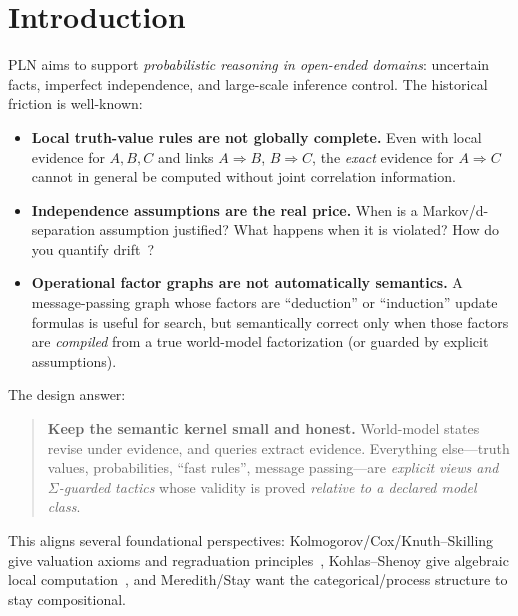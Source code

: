 \documentclass[]{article}
\begin{document}
\section{Introduction}
\label{sec:intro}

PLN aims to support \emph{probabilistic reasoning in open-ended domains}:
uncertain facts, imperfect independence, and large-scale inference control.
The historical friction is well-known:

\begin{itemize}[leftmargin=2em]
\item \textbf{Local truth-value rules are not globally complete.}
Even with local evidence for $A,B,C$ and links $A\Rightarrow B$,
$B\Rightarrow C$, the \emph{exact} evidence for $A\Rightarrow C$ cannot in
general be computed without joint correlation information.
\item \textbf{Independence assumptions are the real price.}
When is a Markov/d-separation assumption justified? What happens when it is
violated? How do you quantify drift~\cite{Pearl1988}?
\item \textbf{Operational factor graphs are not automatically semantics.}
A message-passing graph whose factors are ``deduction'' or ``induction''
update formulas is useful for search, but semantically correct only when
those factors are \emph{compiled} from a true world-model factorization (or
guarded by explicit assumptions).
\end{itemize}

The design answer:

\begin{quote}
\textbf{Keep the semantic kernel small and honest.}
World-model states revise under evidence, and queries extract evidence.
Everything else---truth values, probabilities, ``fast rules'', message
passing---are \emph{explicit views and $\Sigma$-guarded tactics} whose
validity is proved \emph{relative to a declared model class}.
\end{quote}

This aligns several foundational perspectives:
Kolmogorov/Cox/Knuth--Skilling give valuation axioms and regraduation
principles~\cite{KnuthSkilling2012},
Kohlas--Shenoy give algebraic local computation~\cite{KohlasShenoy2000},
and Meredith/Stay want the categorical/process structure to stay
compositional.


\end{document}
